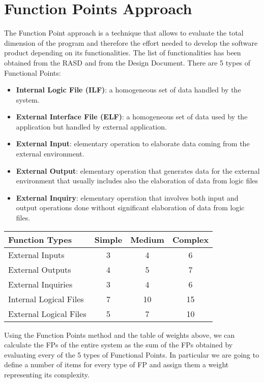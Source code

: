 \chapter{Function Points Approach} \label{chap2}
The Function Point approach is a technique that allows to evaluate the total dimension of the program and therefore the effort needed to develop the software product depending on its functionalities. 
The list of functionalities has been obtained from the RASD and from the Design Document. There are 5 types of Functional Points:

\begin{itemize}
	\item \textbf{Internal Logic File (ILF)}: a homogeneous set of data handled by the system.
	\item \textbf{External Interface File (ELF)}: a homogeneous set of data used by the application but handled by external application.
	\item \textbf{External Input}: elementary operation to elaborate data coming from the external environment.
	\item \textbf{External Output}: elementary operation that generates data for the external environment that usually includes also the elaboration of data from logic files
	\item \textbf{External Inquiry}: elementary operation that involves both input and output operations done without significant elaboration of data from logic files.
\end{itemize}
\clearpage

\begin{table}[!htbp]
\begin{center}
\begin{tabular}[t]{|p{}|c|c|c|}
\hline
\textbf{Function Types} & \textbf{Simple} & \textbf{Medium} & \textbf{Complex}\\
\hline
\hline
External Inputs & 3 & 4 & 6 \\
\hline
External Outputs & 4 & 5 & 7 \\
\hline
External Inquiries & 3 & 4 & 6 \\
\hline
Internal Logical Files & 7 & 10 & 15 \\
\hline
External Logical Files & 5 & 7 & 10 \\
\hline
\end{tabular}
\end{center}
\end{table}

\noindent Using the Function Points method and the table of weights above, we can calculate the FPs of the entire system as the sum of the FPs obtained by evaluating every of the 5 types of Functional Points. In particular we are going to define a number of items for every type of FP and assign them a weight representing its complexity.

